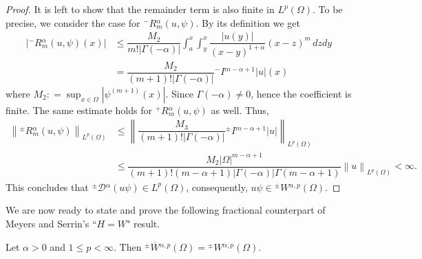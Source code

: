 \documentclass[leqno,final]{siamltex}
\numberwithin{equation}{section}
\renewcommand{\(}{\bigl(}
\renewcommand{\)}{\bigr)}
\begin{document}
\begin{proof}
        It is left to show that the remainder term is also finite in $L^{p}(\Omega)$. To be precise, we consider the case for ${^{-}}{R}{^{\alpha}_{m}}(u,\psi)$. By its definition we get  
        \begin{align*}
            \left|{^{-}}{R}{^{\alpha}_{m}}(u,\psi)(x)\right| 
            &\leq \dfrac{M_2}{m! |\Gamma(- \alpha)|} \int_{a}^{x} \int_{y}^{x} \dfrac{|u(y)|}{(x-y)^{1+\alpha}} (x-z)^{m} \, dz dy\\
            &= \dfrac{M_2}{(m+1)! |\Gamma(- \alpha)|} {^{-}}{I}{^{ m - \alpha+1}}|u|(x)
        \end{align*}
        where $M_2 : = \sup_{x \in \Omega} \left| \psi^{(m+1)} (x) \right|$. Since $\Gamma( - \alpha) \neq 0$, hence the 
        coefficient is finite. The same estimate holds for ${^{+}}{R}{^{\alpha}_{m}}(u,\psi)$ as well. Thus,
        \begin{align*}
            \left\|{^{\pm}}{R}{^{\alpha}_{m}}(u,\psi) \right\|_{L^{p}(\Omega)} 
            &\leq \left\| \dfrac{M_3}{(m+1)! |\Gamma(- \alpha)|} {^{\pm}}{I}{^{ m - \alpha+1}}|u| \right\|_{L^{p}(\Omega)} \\ 
            &\leq \dfrac{M_2|\Omega|^{m - \alpha +1}}{(m+1)! (m- \alpha +1) |\Gamma(- \alpha)|  \Gamma(m - \alpha +1)} \left\| u \right\|_{L^{p}(\Omega)} < \infty .
        \end{align*}
        This concludes that ${^{\pm}}{\mathcal{D}}{^{\alpha}} (u \psi) \in L^{p}(\Omega)$, consequently, $u \psi \in {^{\pm}}{W}{^{\alpha,p}}(\Omega)$. 
    \end{proof}

We are now ready to state and prove the following fractional counterpart of Meyers and Serrin's  
``$H = W$" result.

    \begin{theorem}\label{H=W}
        Let $ \alpha >0$ and $1\leq p <\infty$. Then ${^{\pm}}{\overline{W}}{^{\alpha,p}}(\Omega) = {^{\pm}}{W}{^{\alpha,p}}(\Omega)$.
    \end{theorem}
\end{document}
